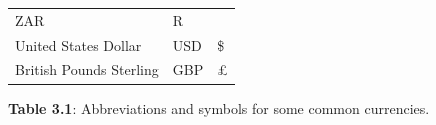 {{\begin{center}
\begin{tabular}[t]{|l|l|l|}
        ZAR &
    
    
        R%
     \tabularnewline\cline{1-1}\cline{2-2}\cline{3-3}
    
    
        United States Dollar &
    
    
        USD &
    
    
        \$%
     \tabularnewline\cline{1-1}\cline{2-2}\cline{3-3}
    
    
        British Pounds Sterling &
    
    
        GBP &
    
    
        £%
     \tabularnewline\cline{1-1}\cline{2-2}\cline{3-3}
    \end{tabular}
      \end{center}
    \begin{center}{\small\bfseries Table 3.1}: Abbreviations and symbols for some common currencies.\end{center}
    
}}
